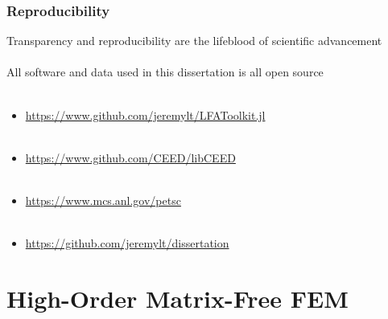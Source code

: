 \documentclass{beamer}
\begin{document}
\begin{frame}
\begin{center}
\frametitle{Reproducibility}

Transparency and reproducibility are the lifeblood of scientific advancement\\

~\\

All software and data used in this dissertation is all open source\\

~\\

\begin{itemize}

\item \href{https://www.github.com/jeremylt/LFAToolkit.jl}{https://www.github.com/jeremylt/LFAToolkit.jl}\\

~\\

\item \href{https://www.github.com/CEED/libCEED}{https://www.github.com/CEED/libCEED}\\

~\\

\item \href{https://www.mcs.anl.gov/petsc}{https://www.mcs.anl.gov/petsc}\\

~\\

\item \href{https://github.com/jeremylt/dissertation}{https://github.com/jeremylt/dissertation}\\

\end{itemize}

\end{center}
\end{frame}

\section{High-Order Matrix-Free FEM}
\end{document}

